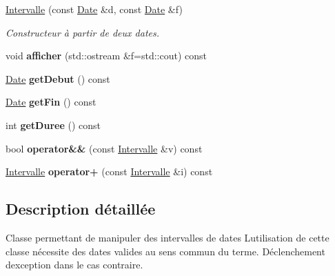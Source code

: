 \begin{DoxyCompactItemize}
\item 
\hyperlink{class_t_i_m_e_1_1_intervalle_a98b63f9c55a777090ec224d61ab26427}{Intervalle} (const \hyperlink{class_t_i_m_e_1_1_date}{Date} \&d, const \hyperlink{class_t_i_m_e_1_1_date}{Date} \&f)
\begin{DoxyCompactList}\small\item\em Constructeur à partir de deux dates. \end{DoxyCompactList}\item 
\hypertarget{class_t_i_m_e_1_1_intervalle_a729d464967de6618da00b772357dc923}{}void {\bfseries afficher} (std\+::ostream \&f=std\+::cout) const \label{class_t_i_m_e_1_1_intervalle_a729d464967de6618da00b772357dc923}

\item 
\hypertarget{class_t_i_m_e_1_1_intervalle_a8a9980c16e051af5e08135815cc3d074}{}\hyperlink{class_t_i_m_e_1_1_date}{Date} {\bfseries get\+Debut} () const \label{class_t_i_m_e_1_1_intervalle_a8a9980c16e051af5e08135815cc3d074}

\item 
\hypertarget{class_t_i_m_e_1_1_intervalle_a20a035fb9d9720ef94e62e1ef45845c3}{}\hyperlink{class_t_i_m_e_1_1_date}{Date} {\bfseries get\+Fin} () const \label{class_t_i_m_e_1_1_intervalle_a20a035fb9d9720ef94e62e1ef45845c3}

\item 
\hypertarget{class_t_i_m_e_1_1_intervalle_adec63857259b690f79de8d16b0ca0c4d}{}int {\bfseries get\+Duree} () const \label{class_t_i_m_e_1_1_intervalle_adec63857259b690f79de8d16b0ca0c4d}

\item 
\hypertarget{class_t_i_m_e_1_1_intervalle_a8f7dca71eb9d8648fa30225360df4fda}{}bool {\bfseries operator\&\&} (const \hyperlink{class_t_i_m_e_1_1_intervalle}{Intervalle} \&v) const \label{class_t_i_m_e_1_1_intervalle_a8f7dca71eb9d8648fa30225360df4fda}

\item 
\hypertarget{class_t_i_m_e_1_1_intervalle_a9dfead5501b190507a2ffa5c29450ffe}{}\hyperlink{class_t_i_m_e_1_1_intervalle}{Intervalle} {\bfseries operator+} (const \hyperlink{class_t_i_m_e_1_1_intervalle}{Intervalle} \&i) const \label{class_t_i_m_e_1_1_intervalle_a9dfead5501b190507a2ffa5c29450ffe}

\end{DoxyCompactItemize}


\subsection{Description détaillée}
Classe permettant de manipuler des intervalles de dates L\textquotesingle{}utilisation de cette classe nécessite des dates valides au sens commun du terme. Déclenchement d\textquotesingle{}exception dans le cas contraire. 


